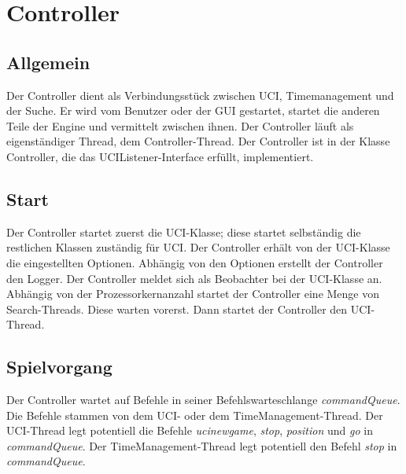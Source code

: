 \section{Controller}\label{sec:controller}
\subsection{Allgemein}\label{subsec:allgemeincontroller}
Der Controller dient als Verbindungsst\"uck zwischen UCI, Timemanagement und der Suche.
Er wird vom Benutzer oder der GUI gestartet, startet die anderen Teile der Engine und vermittelt zwischen ihnen.
Der Controller l\"auft als eigenst\"andiger Thread, dem Controller-Thread.
Der Controller ist in der Klasse Controller, die das UCIListener-Interface erf\"ullt, implementiert.
\subsection{Start}\label{subsec:start}
Der Controller startet zuerst die UCI-Klasse;
diese startet selbst\"andig die restlichen Klassen zust\"andig f\"ur UCI\@.
Der Controller erh\"alt von der UCI-Klasse die eingestellten Optionen.
Abh\"angig von den Optionen erstellt der Controller den Logger.
Der Controller meldet sich als Beobachter bei der UCI-Klasse an.
Abh\"angig von der Prozessorkernanzahl startet der Controller eine Menge von Search-Threads.
Diese warten vorerst.
Dann startet der Controller den UCI-Thread.
\subsection{Spielvorgang}\label{subsec:controllerspielvorgang}
Der Controller wartet auf Befehle in seiner Befehlswarteschlange \textit{commandQueue}.
Die Befehle stammen von dem UCI- oder dem TimeManagement-Thread.
Der UCI-Thread legt potentiell die Befehle \textit{ucinewgame}, \textit{stop}, \textit{position} und \textit{go} in
\textit{commandQueue}.
Der TimeManagement-Thread legt potentiell den Befehl \textit{stop} in \textit{commandQueue}.
\newline
